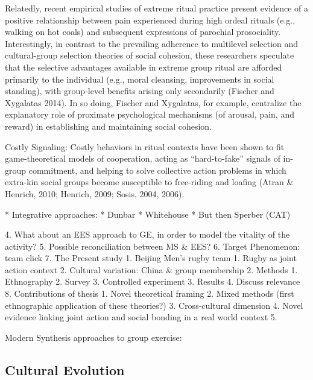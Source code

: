 Relatedly, recent empirical studies of extreme ritual practice present evidence of a positive relationship between pain experienced during high ordeal rituals (e.g., walking on hot coals) and subsequent expressions of parochial prosociality. Interestingly, in contrast to the prevailing adherence to multilevel selection and cultural-group selection theories of social cohesion, these researchers speculate that the selective advantages available in extreme group ritual are afforded primarily to the individual (e.g., moral cleansing, improvements in social standing), with group-level benefits arising only secondarily (Fischer and Xygalatas 2014). In so doing, Fischer and Xygalatas, for example, centralize the explanatory role of proximate psychological mechanisms (of arousal, pain, and reward) in establishing and maintaining social cohesion.


Costly Signaling:
Costly behaviors in ritual contexts have been shown to fit game-theoretical models of cooperation, acting as “hard-to-fake” signals of in-group commitment, and helping to solve collective action problems in which extra-kin social groups become susceptible to free-riding and loafing (Atran & Henrich, 2010; Henrich, 2009; Sosis, 2004, 2006).

* Integrative approaches:
    * Dunbar
    * Whitehouse
    * But then Sperber (CAT)



4. What about an EES approach to GE, in order to model the vitality of the activity?
5. Possible reconciliation between MS & EES?
6. Target Phenomenon: team click
7. The Present study
    1. Beijing Men’s rugby team
        1. Rugby as joint action context
        2. Cultural variation: China & group membership
    2. Methods
        1. Ethnography
        2. Survey
        3. Controlled experiment
    3. Results
    4. Discuss relevance
8. Contributions of thesis
    1. Novel theoretical framing
    2. Mixed methods (first ethnographic application of these theories?)
    3. Cross-cultural dimension
    4. Novel evidence linking joint action and social bonding in a real world context
    5.


Modern Synthesis approaches to group exercise:



\subsection{Cultural Evolution} %




